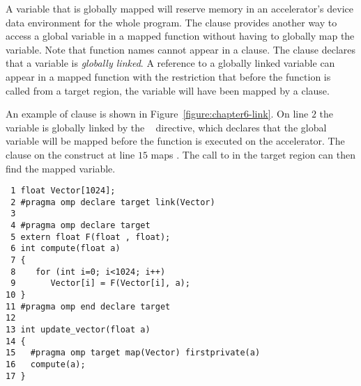 A variable that is globally mapped will reserve memory in an accelerator's
device data environment for the whole program.  The  clause provides
another way to access a global variable in a mapped function without having to
globally map the variable.  Note that function names cannot appear in a
 clause.  The  clause declares that a variable is
\emph{globally linked}.  A reference to a globally linked variable can appear
in a mapped function with the restriction that before the function is called
from a target region, the variable will have been mapped by a 
clause.

An example of  clause is shown in Figure~\ref{figure:chapter6-link}.
On line $2$ the variable  is globally linked by the
~ directive, which declares that the global
variable  will be mapped before the  function is executed on
the accelerator.  The  clause on the  construct at line
$15$ maps .  The call to  in the target region can then
find the mapped  variable.  


\begin{figure*}[!tb]
\begin{verbatim}
 1 float Vector[1024];
 2 #pragma omp declare target link(Vector)
 3 
 4 #pragma omp declare target
 5 extern float F(float , float);
 6 int compute(float a)
 7 {
 8    for (int i=0; i<1024; i++)
 9       Vector[i] = F(Vector[i], a);
10 }
11 #pragma omp end declare target
12 
13 int update_vector(float a)
14 {
15   #pragma omp target map(Vector) firstprivate(a)
16   compute(a);
17 }
\end{verbatim}
\caption{ \textbf {Example of the link clause on a declare target directive} -- \small
          Variables appearing in the \texttt{link} clause are \emph{globally linked}.  
          They must be mapped before they are referenced in a mapped function.
         }
\label{figure:chapter6-link}
\end{figure*}

